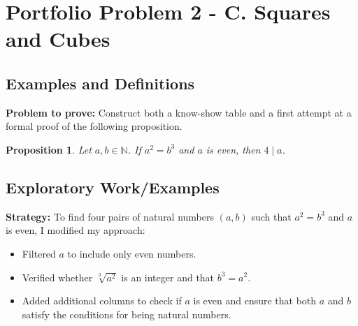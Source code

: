 \documentclass[12pt]{article}
\newtheorem*{prop}{Proposition}
\theoremstyle{definition}
\newcommand{\N}{\mathbb{N}} %
\begin{document}
\section{Portfolio Problem 2 - C. Squares and Cubes}

\subsection{Examples and Definitions}

\textbf{Problem to prove:} Construct both a know-show table and a first attempt at a formal proof of the following proposition.

\begin{prop}
    Let \( a, b \in \N \). If \( a^2 = b^3 \) and \( a \) is even, then \( 4 \mid a \).
\end{prop}

\subsection{Exploratory Work/Examples}

\textbf{Strategy:} 
To find four pairs of natural numbers \( (a, b) \) such that \( a^2 = b^3 \) and \( a \) is even, I modified my approach:
\begin{itemize}
    \item Filtered \( a \) to include only even numbers.
    \item Verified whether \( \sqrt[3]{a^2} \) is an integer and that \( b^3 = a^2 \).
    \item Added additional columns to check if \( a \) is even and ensure that both \( a \) and \( b \) satisfy the conditions for being natural numbers.
\end{itemize}
\end{document}
